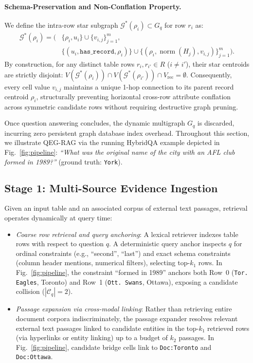 \documentclass[runningheads]{llncs}
\begin{document}
\paragraph{Schema-Preservation and Non-Conflation Property.}
We define the intra-row star subgraph $\mathcal{G}^*(\rho_i) \subset G_q$ for row $r_i$ as:
\begin{equation}
\label{eq:star-subgraph}
\begin{aligned}
\mathcal{G}^*(\rho_i) = \Big( &\{\rho_i, u_i\} \cup \{v_{i,j}\}_{j=1}^m, \\
&\{(u_i, \texttt{has\_record}, \rho_i)\} \cup \{(\rho_i, \operatorname{norm}(H_j), v_{i,j})\}_{j=1}^m \Big).
\end{aligned}
\end{equation}
By construction, for any distinct table rows $r_i, r_{i'} \in R$ ($i \neq i'$), their star centroids are strictly disjoint: $V(\mathcal{G}^*(\rho_i)) \cap V(\mathcal{G}^*(\rho_{i'})) \cap V_{\text{rec}} = \emptyset$. Consequently, every cell value $v_{i,j}$ maintains a unique 1-hop connection to its parent record centroid $\rho_i$, structurally preventing horizontal cross-row attribute conflation across symmetric candidate rows without requiring destructive graph pruning.

Once question answering concludes, the dynamic multigraph $G_q$ is discarded, incurring zero persistent graph database index overhead. Throughout this section, we illustrate QEG-RAG via the running HybridQA example depicted in Fig.~\ref{fig:pipeline}: \textit{``What was the original name of the city with an AFL club formed in 1989?''} (ground truth: \texttt{York}).

\subsection{Stage 1: Multi-Source Evidence Ingestion}
\label{sec:method-retrieval}
Given an input table and an associated corpus of external text passages, retrieval operates dynamically at query time:
\begin{itemize}[leftmargin=1.5em]
    \item \emph{Coarse row retrieval and query anchoring}: A lexical retriever indexes table rows with respect to question $q$. A deterministic query anchor inspects $q$ for ordinal constraints (e.g., ``second'', ``last'') and exact schema constraints (column header mentions, numerical filters), selecting top-$k_1$ rows. In Fig.~\ref{fig:pipeline}, the constraint ``formed in 1989'' anchors both Row~0 (\texttt{Tor. Eagles}, Toronto) and Row~1 (\texttt{Ott. Swans}, Ottawa), exposing a candidate collision ($|\mathcal{C}_q| = 2$).
    \item \emph{Passage expansion via cross-modal linking}: Rather than retrieving entire document corpora indiscriminately, the passage expander resolves relevant external text passages linked to candidate entities in the top-$k_1$ retrieved rows (via hyperlinks or entity linking) up to a budget of $k_2$ passages. In Fig.~\ref{fig:pipeline}, candidate bridge cells link to \texttt{Doc:Toronto} and \texttt{Doc:Ottawa}.
\end{itemize}
\end{document}

